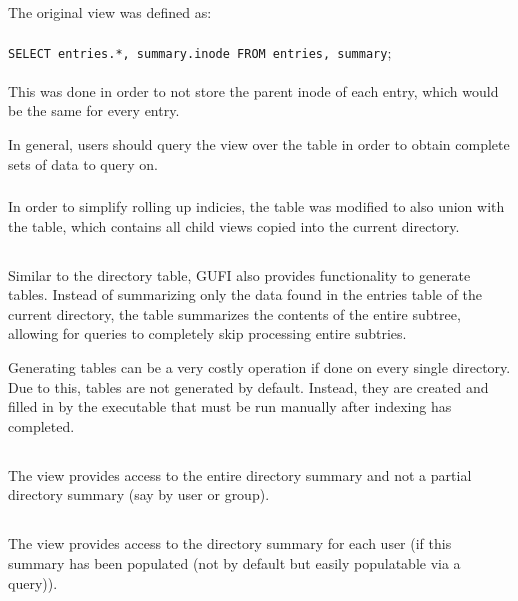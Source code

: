 \subsection{\pentries}
The original \pentries view was defined as:
\\\\
\texttt{SELECT entries.*, summary.inode FROM entries, summary};
\\\\
This was done in order to not store the parent inode of each entry,
which would be the same for every entry.

In general, users should query the \pentries view over the \entries
table in order to obtain complete sets of data to query on.

\subsubsection{\pentriesrollup}
In order to simplify rolling up indicies, the \pentries table was
modified to also union with the \pentriesrollup table, which contains
all child \pentries views copied into the current directory.

\subsection{\treesummary}
\label{sec:schema_treesummary}
Similar to the directory \summary table, GUFI also provides
functionality to generate \treesummary tables. Instead of summarizing
only the data found in the entries table of the current directory, the
\treesummary table summarizes the contents of the entire subtree,
allowing for queries to completely skip processing entire subtries.

Generating \treesummary tables can be a very costly operation if done
on every single directory. Due to this, \treesummary tables are not
generated by default. Instead, they are created and filled in by the
\gufitreesummary executable that must be run manually after indexing has
completed.

\subsection{\vsummarydir}
The \vsummarydir view provides access to the entire directory summary
and not a partial directory summary (say by user or group).

\subsection{\vsummaryuser}
The \vsummaryuser view provides access to the directory summary for
each user (if this summary has been populated (not by default but
easily populatable via a query)).

